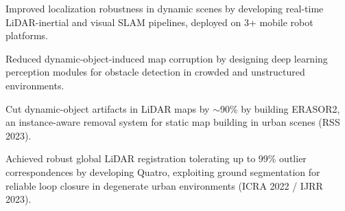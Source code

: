 \documentclass[]{deedy-resume-openfont}
\begin{document}
\begin{minipage}[t]{0.66\textwidth}
\begin{tightemize}
\item Improved localization robustness in dynamic scenes by developing real-time LiDAR-inertial and visual SLAM pipelines, deployed on 3+ mobile robot platforms.
\item Reduced dynamic-object-induced map corruption by designing deep learning perception modules for obstacle detection in crowded and unstructured environments.
\end{tightemize}
\sectionsep

\begin{tightemize}
\item Cut dynamic-object artifacts in LiDAR maps by ${\sim}$90\% by building ERASOR2, an instance-aware removal system for static map building in urban scenes (RSS 2023).
\end{tightemize}
\sectionsep

\begin{tightemize}
\item Achieved robust global LiDAR registration tolerating up to 99\% outlier correspondences by developing Quatro, exploiting ground segmentation for reliable loop closure in degenerate urban environments (ICRA 2022 / IJRR 2023).
\end{tightemize}
\sectionsep

%
%
%
%
%

\end{minipage}
\end{document}
